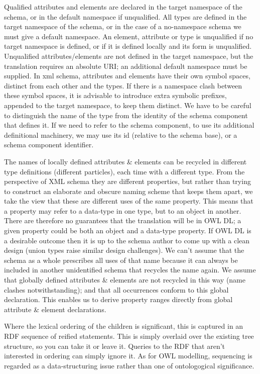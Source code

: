 Qualified attributes and elements are declared in the target namespace of the schema, or in the default namespace if unqualified. All types are defined in the target namespace of the schema, or in the case of a no-\/namespace schema we must give a default namespace. An element, attribute or type is unqualified if no target namespace is defined, or if it is defined locally and its form is unqualified. Unqualified attributes/elements are not defined in the target namespace, but the translation requires an absolute URI; an additional default namespace must be supplied. In xml schema, attributes and elements have their own symbol spaces, distinct from each other and the types. If there is a namespace clash between these symbol spaces, it is advisable to introduce extra symbolic prefixes, appended to the target namespace, to keep them distinct. We have to be careful to distinguish the name of the type from the identity of the schema component that defines it. If we need to refer to the schema component, to use its additional definitional machinery, we may use its id (relative to the schema base), or a schema component identifier.

The names of locally defined attributes \& elements can be recycled in different type definitions (different particles), each time with a different type. From the perspective of XML schema they are different properties, but rather than trying to construct an elaborate and obscure naming scheme that keeps them apart, we take the view that these are different uses of the same property. This means that a property may refer to a data-\/type in one type, but to an object in another. There are therefore no guarantees that the translation will be in OWL DL; a given property could be both an object and a data-\/type property. If OWL DL is a desirable outcome then it is up to the schema author to come up with a clean design (union types raise similar design challenges). We can't assume that the schema as a whole prescribes all uses of that name because it can always be included in another unidentified schema that recycles the name again. We assume that globally defined attributes \& elements are not recycled in this way (name clashes notwithstanding); and that all occurrences conform to this global declaration. This enables us to derive property ranges directly from global attribute \& element declarations.

Where the lexical ordering of the children is significant, this is captured in an RDF sequence of reified statements. This is simply overlaid over the existing tree structure, so you can take it or leave it. Queries to the RDF that aren't interested in ordering can simply ignore it. As for OWL modelling, sequencing is regarded as a data-\/structuring issue rather than one of ontologogical significance.

